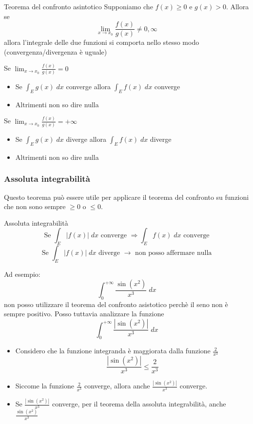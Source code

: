 \begin{teorema}{Teorema del confronto asintotico}
	Supponiamo che $ f\left( x \right) \ge 0 $ e $ g\left( x \right) > 0 $. Allora se
	\[
		\lim_{x \to x_0} \frac{f\left( x \right) }{g\left( x \right) } \neq 0, \infty
	\]
	allora l'integrale delle due funzioni si comporta nello stesso modo (convergenza/divergenza è uguale)

\end{teorema}

Se $ \lim_{x \to x_0} \frac{f\left( x \right) }{g\left( x \right) }  = 0 $
\begin{itemize}
	\item Se $ \int_{E} g\left( x \right)  \; dx $ converge allora $ \int_E f\left( x \right)  \; dx $ converge
	\item Altrimenti non so dire nulla
\end{itemize}
Se $ \lim_{x \to x_0} \frac{f\left( x \right) }{g\left( x \right) }  = +\infty $
\begin{itemize}
	\item Se $ \int_{E} g\left( x \right)  \; dx $ diverge allora $ \int_E f\left( x \right)  \; dx $ diverge
	\item Altrimenti non so dire nulla
\end{itemize}
\subsubsection*{Assoluta integrabilità}
Questo teorema può essere utile per applicare il teorema del confronto su funzioni che non sono sempre $ \ge 0  $ o $ \le 0 $.

\begin{teorema}{Assoluta integrabilità}
	\[
		\text{ Se }\int_{E}\left|f\left( x \right) \right| \; dx \text{ converge } \Rightarrow \int_{E} f\left( x \right)  \; dx \text{ converge }
	\]
	\[
		\text{ Se } \int_{E}\left|f\left( x \right) \right| \; dx \text{ diverge } \rightarrow \text{ non posso affermare nulla }
	\]

\end{teorema}
Ad esempio:
\[
	\int_{0}^{+ \infty} \frac{\sin \left( x^2 \right) }{x^3} \; dx
\]
non posso utilizzare il teorema del confronto asistotico perchè il seno non è sempre positivo. Posso tuttavia analizzare la funzione
\[
	\int_{0}^{+ \infty} \frac{\left|\sin \left( x^2 \right) \right| }{x^3} \; dx
\]
\begin{itemize}
	\item Considero che la funzione integranda è maggiorata dalla funzione $ \frac{2}{x^3} $
	      \[
		      \frac{\left|\sin \left( x^2 \right) \right|}{x^3} \le \frac{2}{x^3}
	      \]
	\item Siccome la funzione $ \frac{2}{x^3} $ converge, allora anche $ \frac{\left|\sin \left( x^2 \right) \right|}{x^3} $ converge.
	\item  Se $ \frac{\left|\sin \left( x^2 \right) \right|}{x^3} $ converge, per il teorema della assoluta integrabilità, anche $\frac{\sin \left( x^2 \right) }{x^3} $
\end{itemize}
